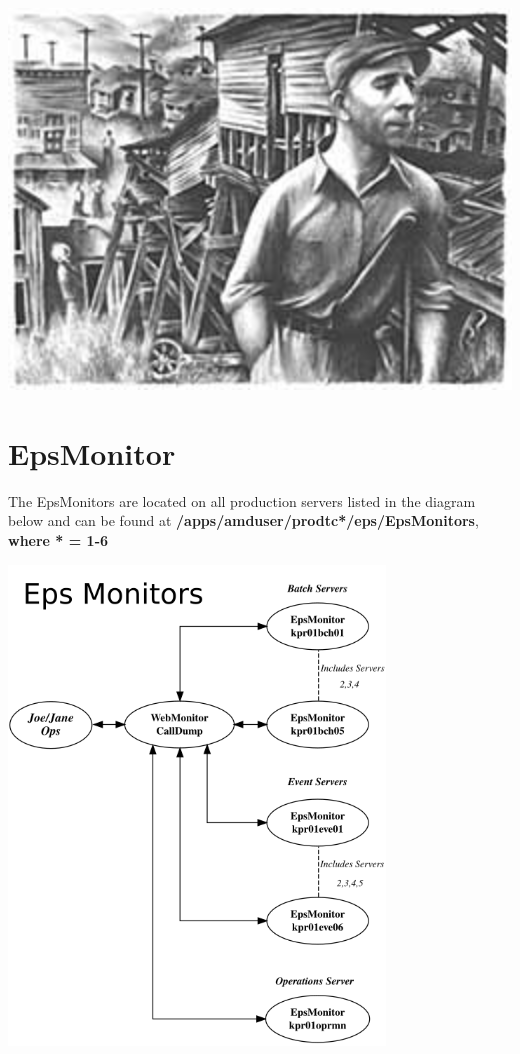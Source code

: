 \documentclass[12pt,twoside]{article}
\begin{document}
\includegraphics[width=14cm]{Pictures/shahn.jpg}

\normalsize
\newpage

\section{EpsMonitor}
\label{sec:orgheadline87}
The EpsMonitors are located on all production servers listed in the diagram below and can be found at
\textbf{/apps/amduser/prodtc*/eps/EpsMonitors}, \textbf{where * = 1-6}


\includegraphics[width=10cm]{Pictures/EpsMonitors.png}
\end{document}
